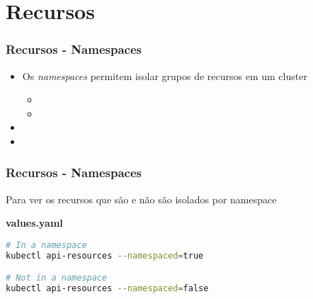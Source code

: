 \section{Recursos}

\begin{frame}
\frametitle{Recursos - Namespaces}

\begin{itemize}
	\item Os \textit{namespaces} permitem isolar grupos de recursos em um cluster
		\begin{itemize}
			\item {}
			\item {}
		\end{itemize}
	\item {}
	\item {}
\end{itemize}
\end{frame}

\begin{frame}[containsverbatim]
\frametitle{Recursos - Namespaces}

Para ver os recursos que são e não são isolados por namespace

\begin{center}
\begin{minipage}{0.9\textwidth}
\begin{block}{\textbf{values.yaml}}
\begin{lstlisting}[language=bash]
# In a namespace
kubectl api-resources --namespaced=true

# Not in a namespace
kubectl api-resources --namespaced=false
\end{lstlisting}
\end{block}
\end{minipage}
\end{center}
\end{frame}

